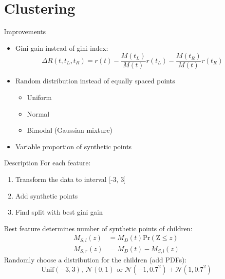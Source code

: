 \documentclass[shortpres]{beamer}
\begin{document}
\section{Clustering}

\begin{frame}{Improvements}
    \begin{itemize}
        \item Gini gain instead of gini index:
        $$ \Delta R(t, t_L, t_R)= r(t) - \frac{M(t_L)}{M(t)}r(t_L) - \frac{M(t_R)}{M(t)}r(t_R) $$
        \item Random distribution instead of equally spaced points
        \begin{itemize}
            \item Uniform
            \item Normal
            \item Bimodal (Gaussian mixture)
        \end{itemize}
        \item Variable proportion of synthetic points
    \end{itemize}
\end{frame}

\begin{frame}{Description}
    For each feature:
    \begin{enumerate}
        \item Transform the data to interval [-3, 3]
        \item Add synthetic points
        \item Find split with best gini gain
    \end{enumerate}
    Best feature determines number of synthetic points of children:
    \begin{equation}
    \begin{split}
        M_{S, l}(z) & = M_{D}(t) \textrm{Pr}(\textrm{Z} \leq z) \\
        M_{S, r}(z) & = M_{D}(t) - M_{S, l}(z)
    \end{split}
    \end{equation}
    Randomly choose a distribution for the children (add PDFs):
    $$ \textrm{Unif}(-3,3), \ \mathcal{N}(0,1) \textrm{ or } \mathcal{N}(-1,0.7^2) + \mathcal{N}(1,0.7^2) $$
\end{frame}
\end{document}
